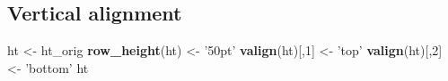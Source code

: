 \documentclass[]{article}
\newenvironment{Shaded}{\begin{snugshade}}{\end{snugshade}}
\newcommand{\KeywordTok}[1]{\textcolor[rgb]{0.13,0.29,0.53}{\textbf{{#1}}}}
\newcommand{\DecValTok}[1]{\textcolor[rgb]{0.00,0.00,0.81}{{#1}}}
\newcommand{\StringTok}[1]{\textcolor[rgb]{0.31,0.60,0.02}{{#1}}}
\newcommand{\NormalTok}[1]{{#1}}
\begin{document}
\FloatBarrier

\subsection{Vertical alignment}\label{vertical-alignment}

\begin{Shaded}
\begin{Highlighting}[]
\NormalTok{ht <-}\StringTok{ }\NormalTok{ht_orig}
\KeywordTok{row_height}\NormalTok{(ht) <-}\StringTok{ '50pt'}
\KeywordTok{valign}\NormalTok{(ht)[,}\DecValTok{1}\NormalTok{] <-}\StringTok{ 'top'}
\KeywordTok{valign}\NormalTok{(ht)[,}\DecValTok{2}\NormalTok{] <-}\StringTok{ 'bottom'}
\NormalTok{ht}
\end{Highlighting}
\end{Shaded}
\end{document}
